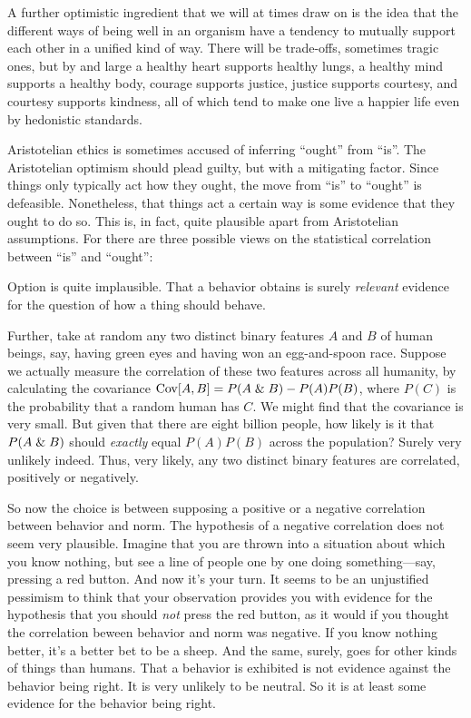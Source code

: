 A further optimistic ingredient that we will at times draw on is the idea that the different ways of being
well in an organism have a tendency to mutually support each other in a unified kind of way. There will be
trade-offs, sometimes tragic ones, but by and large a healthy heart supports healthy lungs, a healthy mind supports a healthy body,
courage supports justice, justice supports courtesy, and courtesy supports kindness, all of which tend to make
one live a happier life even by hedonistic standards. 

Aristotelian ethics is sometimes accused of inferring ``ought'' from ``is''. The Aristotelian optimism should plead
guilty, but with a mitigating factor. Since things only typically act how they ought, the move from ``is'' to ``ought''
is defeasible. Nonetheless, that things act a certain way is some evidence that they ought to do so. This is, in fact,
quite plausible apart from Aristotelian assumptions. For there are three possible views on the statistical correlation
between ``is'' and ``ought'':

Option  is quite implausible. That a behavior obtains is surely \textit{relevant} evidence for
the question of how a thing should behave. 

Further, take at random any two distinct binary features $A$ and $B$ of human beings, say, 
having green eyes and having won an egg-and-spoon race. Suppose we actually measure the correlation of these two features 
across all humanity, by calculating the covariance $\operatorname{Cov}[A,B]=P(A\mathrel{\&} B)-P(A)P(B)$, where $P(C)$ is the probability that a random human has
$C$. We might find that the covariance is very small. But given that there are eight billion people, how likely is it that $P(A\mathrel{\&} B)$ should
\textit{exactly} equal $P(A)P(B)$ across the population? Surely very unlikely indeed. Thus, very likely, any two distinct binary features
are correlated, positively or negatively.

So now the choice is between supposing a positive or a negative correlation between behavior and norm. The hypothesis of a negative 
correlation does not seem very plausible. Imagine that you are thrown into a situation about which you know nothing, but see a line of people
one by one doing something---say, pressing a red button. And now it's your turn. It seems to be an unjustified pessimism to think that your 
observation provides you with evidence for the hypothesis that you should \textit{not} press the red button, as it would if you thought
the correlation beween behavior and norm was negative. If you know nothing better, it's a better bet to be a sheep. And the same, surely,
goes for other kinds of things than humans. That a behavior is exhibited is not evidence against the behavior being right. It is very unlikely
to be neutral. So it is at least some evidence for the behavior being right.

